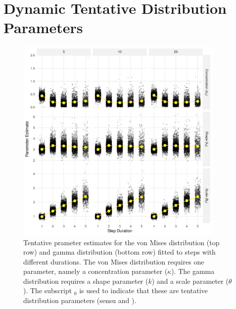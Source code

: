 \documentclass[../FinalThesis.tex]{subfiles}
\begin{document}
\section{Dynamic Tentative Distribution Parameters}
\begin{figure}[!ht]
  \begin{center}
  \includegraphics[width = 0.9\textwidth]{Figures/DistributionParameters.png}
  \caption{Tentative prameter estimates for the von Mises distribution (top row) and
  gamma distribution (bottom row) fitted to steps with different durations. The
  von Mises distribution requires one parameter, namely a concentration
  parameter ($\kappa$). The gamma distribution requires a shape parameter ($k$)
  and a scale parameter ($\theta$). The subscript $_0$ is used to indicate that
  these are tentative distribution parameters (sensu \citealp{Avgar.2016} and
  \citealp{Fieberg.2021}).}
  \label{DistributionParameters}
  \end{center}
\end{figure}

\newpage
\end{document}
